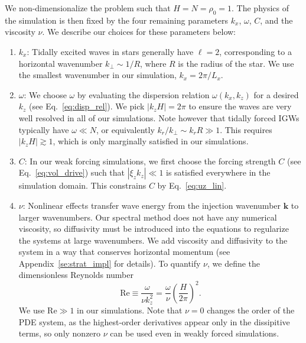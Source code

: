 \documentclass[
        fleqn,
        usenatbib,
        referee,
    ]{mnras}
\newcommand*{\abs}[1]{\left|#1\right|}
\newcommand*{\p}[1]{\left(#1\right)}
\newcommand*{\bm}[1]{\mathbf{#1}}
\begin{document}
We non-dimensionalize the problem such that $H = N = \rho_0 = 1$. The physics of
the simulation is then fixed by the four remaining parameters $k_{x}$, $\omega$,
$C$, and the viscosity $\nu$. We describe our choices for these parameters
below:
\begin{enumerate}
    \item $k_{x}$: Tidally excited waves in stars generally have $\ell = 2$,
        corresponding to a horizontal wavenumber $k_\perp\sim 1/R$, where $R$ is
        the radius of the star. We use the smallest wavenumber in our
        simulation, $k_x=2\pi/L_x$.

    \item $\omega$: We choose $\omega$ by evaluating the dispersion relation
        $\omega(k_x, k_z)$ for a desired $k_z$ (see Eq.~\eqref{eq:disp_rel}). We
        pick $\abs{k_z H} = 2\pi$ to ensure the waves are very well resolved in
        all of our simulations. Note however that tidally forced IGWs typically
        have $\omega \ll N$, or equivalently $k_r/k_\perp \sim k_r R \gg 1$.
        This requires $\abs{k_z H} \gtrsim 1$, which is only marginally
        satisfied in our simulations.

    \item $C$: In our weak forcing simulations, we first choose the forcing
        strength $C$ (see Eq.~\eqref{eq:vol_drive}) such that $\abs{\xi_z k_z}
        \ll 1$ is satisfied everywhere in the simulation domain. This constrains
        $C$ by Eq.~\eqref{eq:uz_lin}.

    \item $\nu$: Nonlinear effects transfer wave energy from the injection
        wavenumber $\bm{k}$ to larger wavenumbers. Our spectral method does not
        have any numerical viscosity, so diffusivity must be introduced into the
        equations to regularize the systems at large wavenumbers. We add
        viscosity and diffusivity to the system in a way that conserves
        horizontal momentum (see Appendix~\ref{se:strat_impl} for details). To
        quantify $\nu$, we define the dimensionless Reynolds number
        \begin{equation}
            \mathrm{Re} \equiv \frac{\omega}{\nu k_{z}^2}
                = \frac{\omega}{\nu}\p{\frac{H}{2\pi}}^2.\label{eq:re_def}
        \end{equation}
        We use $\mathrm{Re} \gg 1$ in our simulations. Note that $\nu = 0$ changes the order of the PDE system, as the
        highest-order derivatives appear only in the dissipitive terms, so only
        nonzero $\nu$ can be used even in weakly forced simulations.
\end{enumerate}
\end{document}
